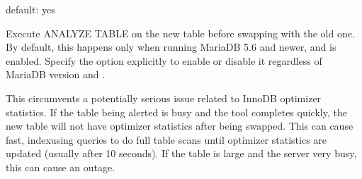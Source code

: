 \documentclass[letterpaper,10pt,english]{sphinxmanual}
\begin{document}

\begin{fulllineitems}
\label{\detokenize{mariadb-schema-change:cmdoption-mariadb-schema-change-0}}
default: yes

Execute ANALYZE TABLE on the new table before swapping with the old one.
By default, this happens only when running MariaDB 5.6 and newer, and
 is enabled. Specify the option explicitly to enable
or disable it regardless of MariaDB version and .

This circumvents a potentially serious issue related to InnoDB optimizer
statistics. If the table being alerted is busy and the tool completes quickly,
the new table will not have optimizer statistics after being swapped. This can
cause fast, index\sphinxhyphen{}using queries to do full table scans until optimizer
statistics are updated (usually after 10 seconds). If the table is large and
the server very busy, this can cause an outage.

\end{fulllineitems}

\end{document}
